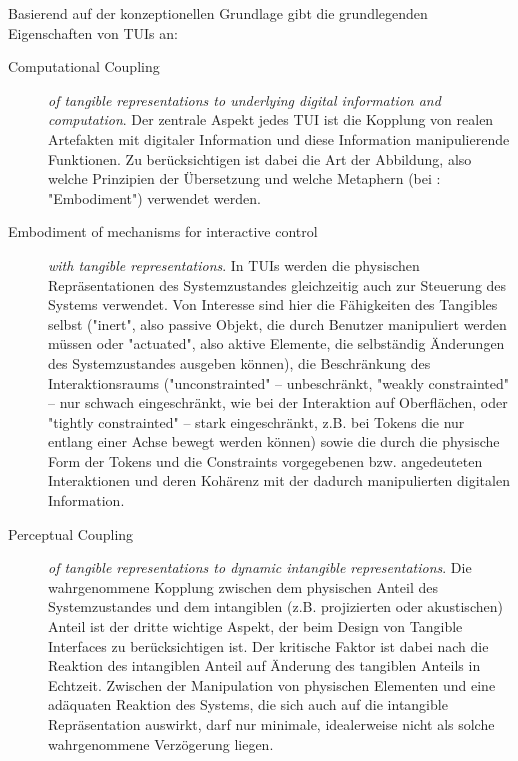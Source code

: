 Basierend auf der konzeptionellen Grundlage gibt \citeauthor{Ishii08} die grundlegenden Eigenschaften von \glspl{TUI} an:
\begin{description}
	\item[Computational Coupling] \emph{of tangible representations to underlying digital information and computation}. Der zentrale Aspekt jedes \gls{TUI} ist die Kopplung von realen Artefakten mit digitaler Information und diese Information manipulierende Funktionen. Zu berücksichtigen ist dabei die Art der Abbildung, also welche Prinzipien der Übersetzung und welche Metaphern (bei \citeauthor{Ishii08}: "Embodiment") verwendet werden.
	\item[Embodiment of mechanisms for interactive control] \emph{with tangible representations}. In \glspl{TUI} werden die physischen Repräsentationen des Systemzustandes gleichzeitig auch zur Steuerung des Systems verwendet. Von Interesse sind hier die Fähigkeiten des Tangibles selbst ("inert", also passive Objekt, die durch Benutzer manipuliert werden müssen oder "actuated", also aktive Elemente, die selbständig Änderungen des Systemzustandes ausgeben können), die Beschränkung des Interaktionsraums ("unconstrainted" -- unbeschränkt, "weakly constrainted" -- nur schwach eingeschränkt, wie bei der Interaktion auf Oberflächen, oder "tightly constrainted" -- stark eingeschränkt, z.B. bei Tokens die nur entlang einer Achse bewegt werden können) sowie die durch die physische Form der Tokens und die Constraints vorgegebenen bzw. angedeuteten Interaktionen und deren Kohärenz mit der dadurch manipulierten digitalen Information.
	\item[Perceptual Coupling] \emph{of tangible representations to dynamic intangible representations}. Die wahrgenommene Kopplung zwischen dem physischen Anteil des Systemzustandes und dem intangiblen (z.B. projizierten oder akustischen) Anteil ist der dritte wichtige Aspekt, der beim Design von Tangible Interfaces zu berücksichtigen ist. Der kritische Faktor ist dabei nach \citeauthor{Ishii08} die Reaktion des intangiblen Anteil auf Änderung des tangiblen Anteils in Echtzeit. Zwischen der Manipulation von physischen Elementen und eine adäquaten Reaktion des Systems, die sich auch auf die intangible Repräsentation auswirkt, darf nur minimale, idealerweise nicht als solche wahrgenommene Verzögerung liegen. 
\end{description}

